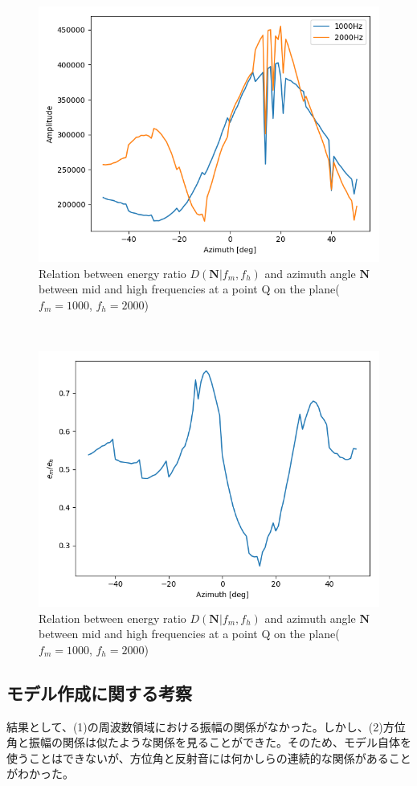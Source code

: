 \begin{figure}[ht]
  \begin{center}
  \vspace{1zh}
    \includegraphics[width=0.5\linewidth]{images/3_amp_azi_heimen.png}   
  \end{center}
  \caption{Relation between energy ratio $D(\mathbf{N}|f_m, f_h)$ and azimuth angle $\mathbf{N}$ between mid and high frequencies at a point Q on the plane($f_m = 1000$, $f_h = 2000$)}
  \label{fig:result2}
\end{figure}

\begin{figure}[ht]　　
  \begin{center}
  \vspace{1zh}
    \includegraphics[width=0.5\linewidth]{images/3_d_n_heimen.png}   
  \end{center}
  \caption{Relation between energy ratio $D(\mathbf{N}|f_m, f_h)$ and azimuth angle $\mathbf{N}$ between mid and high frequencies at a point Q on the plane($f_m = 1000$, $f_h = 2000$)}
  \label{fig:result3}
\end{figure}

\clearpage

\subsection{モデル作成に関する考察}
\label{sec:model_dissucussion}
 結果として、(1)の周波数領域における振幅の関係がなかった。しかし、(2)方位角と振幅の関係は似たような関係を見ることができた。そのため、モデル自体を使うことはできないが、方位角と反射音には何かしらの連続的な関係があることがわかった。
 
